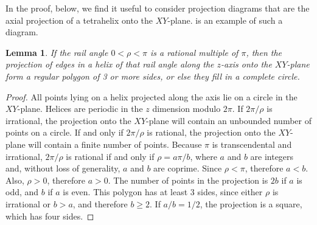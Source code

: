 \documentclass[twocolumn,10pt]{asme2ej}
\newtheorem{lemma}{Lemma}
\begin{document}
In the proof, below, we find it useful to consider projection diagrams that are the axial projection
of a tetrahelix onto the $XY$-plane.  is an example of such a diagram.
\begin{lemma}
  If the rail angle $0 < \rho < \pi$ is a rational multiple of $\pi$, then the projection of
  edges in a helix of that rail angle  along the $z$-axis onto the $XY$-plane form a
  regular polygon of 3 or more sides, or else they fill in a complete circle.
  \label{lemma:ngon}
\end{lemma}
\begin{proof}
  All points lying on a helix projected along the axis lie on a circle in the $XY$-plane.
  Helices are periodic in the $z$ dimension modulo $2\pi$.
  If $2\pi/\rho$ is irrational, the projection onto the $XY$-plane will contain
  an unbounded number of points on a circle.
  If and only if $2\pi/\rho$ is rational, the projection onto
  the $XY$-plane will contain a finite number of points.
  Because $\pi$ is transcendental and irrational,
  $2\pi/\rho$ is rational if and only if $\rho = a\pi/b$, where $a$ and $b$ are integers
  and, without loss of generality, $a$ and $b$ are coprime.
  Since $\rho < \pi$, therefore $a < b$. Also, $\rho > 0$, therefore $a > 0$.
  The number of points in the projection is $2b$ if $a$ is odd, and $b$ if $a$ is even.
  This polygon has at least 3 sides, since either $\rho$ is irrational or $b > a$, and therefore
  $b \geq 2$. If $a/b = 1/2$, the projection is a square, which has four sides. 
\end{proof}
\end{document}
